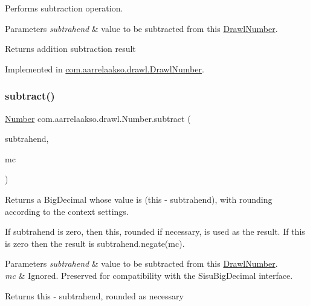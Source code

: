 Performs subtraction operation. 


\begin{DoxyParams}{Parameters}
{\em subtrahend} & value to be subtracted from this \hyperlink{classcom_1_1aarrelaakso_1_1drawl_1_1_drawl_number}{Drawl\+Number}. \\
\hline
\end{DoxyParams}
\begin{DoxyReturn}{Returns}
addition subtraction result 
\end{DoxyReturn}


Implemented in \hyperlink{classcom_1_1aarrelaakso_1_1drawl_1_1_drawl_number_ab5072a1d6694648646b386c3f7e65b0e}{com.\+aarrelaakso.\+drawl.\+Drawl\+Number}.

\mbox{\label{interfacecom_1_1aarrelaakso_1_1drawl_1_1_number_aae7cf801905b2510138d37ff932c4d30}} 
\subsubsection{\texorpdfstring{subtract()}{subtract()}\hspace{0.1cm}{\footnotesize\ttfamily [2/3]}}
{\footnotesize\ttfamily \hyperlink{interfacecom_1_1aarrelaakso_1_1drawl_1_1_number}{Number} com.\+aarrelaakso.\+drawl.\+Number.\+subtract (\begin{DoxyParamCaption}\item[{@Not\+Null final \hyperlink{interfacecom_1_1aarrelaakso_1_1drawl_1_1_number}{Number}}]{subtrahend,  }\item[{final Math\+Context}]{mc }\end{DoxyParamCaption})}



Returns a Big\+Decimal whose value is (this -\/ subtrahend), with rounding according to the context settings. 

If subtrahend is zero, then this, rounded if necessary, is used as the result. If this is zero then the result is subtrahend.\+negate(mc).


\begin{DoxyParams}{Parameters}
{\em subtrahend} & value to be subtracted from this \hyperlink{classcom_1_1aarrelaakso_1_1drawl_1_1_drawl_number}{Drawl\+Number}. \\
\hline
{\em mc} & Ignored. Preserved for compatibility with the Sisu\+Big\+Decimal interface. \\
\hline
\end{DoxyParams}
\begin{DoxyReturn}{Returns}
this -\/ subtrahend, rounded as necessary 
\end{DoxyReturn}

